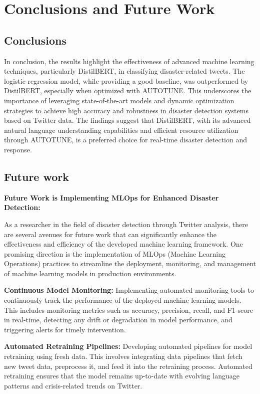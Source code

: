 \chapter{Conclusions and Future Work}
\label{ch:con}
\section{Conclusions}

In conclusion, the results highlight the effectiveness of advanced machine learning techniques, particularly DistilBERT, in classifying disaster-related tweets. The logistic regression model, while providing a good baseline, was outperformed by DistilBERT, especially when optimized with AUTOTUNE. This underscores the importance of leveraging state-of-the-art models and dynamic optimization strategies to achieve high accuracy and robustness in disaster detection systems based on Twitter data. The findings suggest that DistilBERT, with its advanced natural language understanding capabilities and efficient resource utilization through AUTOTUNE, is a preferred choice for real-time disaster detection and response.

\section{Future work}

\textbf{Future Work is Implementing MLOps for Enhanced Disaster Detection:}

As a researcher in the field of disaster detection through Twitter analysis, there are several avenues for future work that can significantly enhance the effectiveness and efficiency of the developed machine learning framework. One promising direction is the implementation of MLOps (Machine Learning Operations) practices to streamline the deployment, monitoring, and management of machine learning models in production environments.

\textbf{Continuous Model Monitoring:} Implementing automated monitoring tools to continuously track the performance of the deployed machine learning models. This includes monitoring metrics such as accuracy, precision, recall, and F1-score in real-time, detecting any drift or degradation in model performance, and triggering alerts for timely intervention.

\textbf{Automated Retraining Pipelines:} Developing automated pipelines for model retraining using fresh data. This involves integrating data pipelines that fetch new tweet data, preprocess it, and feed it into the retraining process. Automated retraining ensures that the model remains up-to-date with evolving language patterns and crisis-related trends on Twitter.

